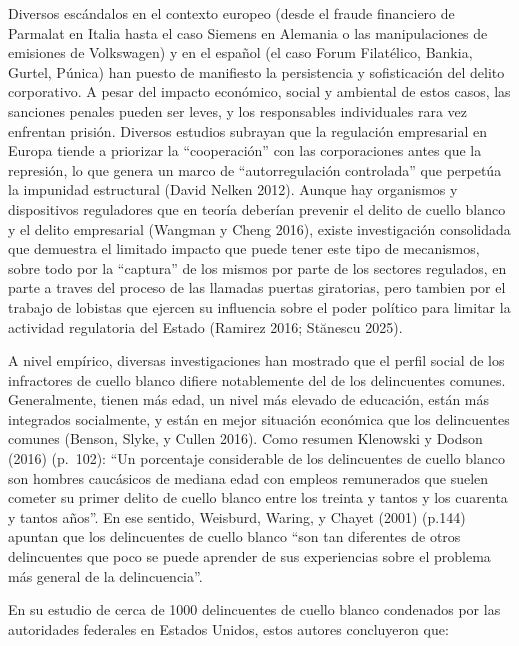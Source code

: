 \documentclass[
  spanish,
  letterpaper,
  DIV=11,
  numbers=noendperiod]{scrreprt}
\begin{document}
Diversos escándalos en el contexto europeo (desde el fraude financiero
de Parmalat en Italia hasta el caso Siemens en Alemania o las
manipulaciones de emisiones de Volkswagen) y en el español (el caso
Forum Filatélico, Bankia, Gurtel, Púnica) han puesto de manifiesto la
persistencia y sofisticación del delito corporativo. A pesar del impacto
económico, social y ambiental de estos casos, las sanciones penales
pueden ser leves, y los responsables individuales rara vez enfrentan
prisión. Diversos estudios subrayan que la regulación empresarial en
Europa tiende a priorizar la ``cooperación'' con las corporaciones antes
que la represión, lo que genera un marco de ``autorregulación
controlada'' que perpetúa la impunidad estructural (David Nelken 2012).
Aunque hay organismos y dispositivos reguladores que en teoría deberían
prevenir el delito de cuello blanco y el delito empresarial (Wangman y
Cheng 2016), existe investigación consolidada que demuestra el limitado
impacto que puede tener este tipo de mecanismos, sobre todo por la
``captura'' de los mismos por parte de los sectores regulados, en parte
a traves del proceso de las llamadas puertas giratorias, pero tambien
por el trabajo de lobistas que ejercen su influencia sobre el poder
político para limitar la actividad regulatoria del Estado (Ramirez 2016;
Stănescu 2025).

A nivel empírico, diversas investigaciones han mostrado que el perfil
social de los infractores de cuello blanco difiere notablemente del de
los delincuentes comunes. Generalmente, tienen más edad, un nivel más
elevado de educación, están más integrados socialmente, y están en mejor
situación económica que los delincuentes comunes (Benson, Slyke, y
Cullen 2016). Como resumen Klenowski y Dodson (2016) (p.~102): ``Un
porcentaje considerable de los delincuentes de cuello blanco son hombres
caucásicos de mediana edad con empleos remunerados que suelen cometer su
primer delito de cuello blanco entre los treinta y tantos y los cuarenta
y tantos años''. En ese sentido, Weisburd, Waring, y Chayet (2001)
(p.144) apuntan que los delincuentes de cuello blanco ``son tan
diferentes de otros delincuentes que poco se puede aprender de sus
experiencias sobre el problema más general de la delincuencia''.

En su estudio de cerca de 1000 delincuentes de cuello blanco condenados
por las autoridades federales en Estados Unidos, estos autores
concluyeron que:
\end{document}

